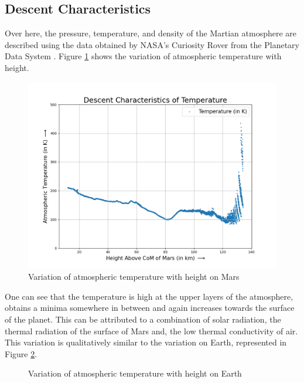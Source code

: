 \subsection{Descent Characteristics}

Over here, the pressure, temperature, and density of the Martian atmosphere are described using the data obtained by NASA's Curiosity Rover from the Planetary Data System \cite{holstein2016atmospheric}. Figure \ref{gra:temp} shows the variation of atmospheric temperature with height.

\begin{figure}[H]
  \includegraphics[scale=0.4]{Pictures/Chapter_7_Future/Cleaned_Temperature_Plot.png}
  \centering
  \caption{Variation of atmospheric temperature with height on Mars}
  \label{gra:temp}
\end{figure}

\no One can see that the temperature is high at the upper layers of the atmosphere, obtains a minima somewhere in between and again increases towards the surface of the planet. This can be attributed to a combination of solar radiation, the thermal radiation of the surface of Mars and, the low thermal conductivity of air. This variation is qualitatively similar to the variation on Earth, represented in Figure \ref{gra:temp_e}.

\begin{figure}[H]
	\centering
    
    \caption{Variation of atmospheric temperature with height on Earth}
	\label{gra:temp_e}
\end{figure}

